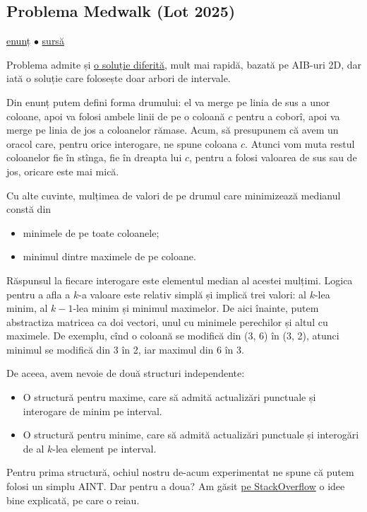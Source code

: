 \documentclass[../main.tex]{subfiles}
\begin{document}
\subsection{Problema Medwalk (Lot 2025)}
\label{problem:medwalk}

\href{https://kilonova.ro/problems/3790}{enunț}
$\bullet$
\hyperref[code:medwalk]{sursă}

Problema admite și \href{https://kilonova.ro/submissions/770475}{o soluție diferită}, mult mai rapidă, bazată pe AIB-uri 2D, dar iată o soluție care folosește doar arbori de intervale.

Din enunț putem defini forma drumului: el va merge pe linia de sus a unor coloane, apoi va folosi ambele linii de pe o coloană $c$ pentru a coborî, apoi va merge pe linia de jos a coloanelor rămase. Acum, să presupunem că avem un oracol care, pentru orice interogare, ne spune coloana $c$. Atunci vom muta restul coloanelor fie în stînga, fie în dreapta lui $c$, pentru a folosi valoarea de sus sau de jos, oricare este mai mică.

Cu alte cuvinte, mulțimea de valori de pe drumul care minimizează medianul constă din

\begin{itemize}
  \item minimele de pe toate coloanele;
  \item minimul dintre maximele de pe coloane.
\end{itemize}

Răspunsul la fiecare interogare este elementul median al acestei mulțimi. Logica pentru a afla a $k$-a valoare este relativ simplă și implică trei valori: al $k$-lea minim, al $k-1$-lea minim și minimul maximelor. De aici înainte, putem abstractiza matricea ca doi vectori, unul cu minimele perechilor și altul cu maximele. De exemplu, cînd o coloană se modifică din (3, 6) în (3, 2), atunci minimul se modifică din 3 în 2, iar maximul din 6 în 3.

De aceea, avem nevoie de două structuri independente:

\begin{itemize}
  \item O structură pentru maxime, care să admită actualizări punctuale și interogare de minim pe interval.
  \item O structură pentru minime, care să admită actualizări punctuale și interogări de al $k$-lea element pe interval.
\end{itemize}

Pentru prima structură, ochiul nostru de-acum experimentat ne spune că putem folosi un simplu AINT. Dar pentru a doua? Am găsit \href{https://stackoverflow.com/a/22075025/6022817}{pe StackOverflow} o idee bine explicată, pe care o reiau.
\end{document}
